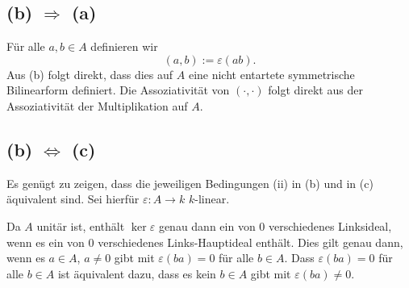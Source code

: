 \documentclass[a4paper,10pt]{article}
\begin{document}
\subsection*{(b) $\Rightarrow$ (a)}
Für alle $a,b \in A$ definieren wir
\[
 (a,b) := \varepsilon(ab).
\]
Aus (b) folgt direkt, dass dies auf $A$ eine nicht entartete symmetrische Bilinearform definiert. Die Assoziativität von $(\cdot, \cdot)$ folgt direkt aus der Assoziativität der Multiplikation auf $A$.


\subsection*{(b) $\Leftrightarrow$ (c)}
Es genügt zu zeigen, dass die jeweiligen Bedingungen (ii) in (b) und in (c) äquivalent sind. Sei hierfür $\varepsilon : A \to k$ $k$-linear.

Da $A$ unitär ist, enthält $\ker \varepsilon$ genau dann ein von $0$ verschiedenes Linksideal, wenn es ein von $0$ verschiedenes Links-Hauptideal enthält. Dies gilt genau dann, wenn es $a \in A$, $a \neq 0$ gibt mit $\varepsilon(ba) = 0$ für alle $b \in A$. Dass $\varepsilon(ba) = 0$ für alle $b \in A$ ist äquivalent dazu, dass es kein $b \in A$ gibt mit $\varepsilon(ba) \neq 0$.
\end{document}
